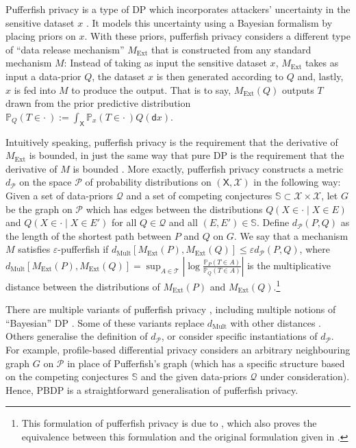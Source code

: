 \documentclass{article}
\theoremstyle{plain}
\theoremstyle{plain}
\theoremstyle{definition}
\theoremstyle{remark}
\theoremstyle{plain}
\newcommand{\xset}{\mathsf{X}}
\newcommand{\Mext}{M_{\mathrm{Ext}}}
\newcommand{\dMult}{d_{\mathrm{Mult}}}
\renewcommand{\epsilon}{\varepsilon}
\begin{document}
Pufferfish privacy is a type of DP which incorporates attackers' uncertainty in the sensitive dataset $x$ \citep{kiferPufferfishFrameworkMathematical2014}. It models this uncertainty using a Bayesian formalism by placing priors on $x$. With these priors, pufferfish privacy considers a different type of ``data release mechanism'' $\Mext$ that is constructed from any standard mechanism $M$: Instead of taking as input the sensitive dataset $x$, $\Mext$ takes as input a data-prior $Q$, the dataset $x$ is then generated according to $Q$ and, lastly, $x$ is fed into $M$ to produce the output. That is to say, $\Mext(Q)$ outputs $T$ drawn from the prior predictive distribution $\mathbb P_Q(T \in \cdot \ ) := \int_{\mathsf X} \mathbb P_{x}(T \in \cdot \ ) Q(\mathsf d x)$.

Intuitively speaking, pufferfish privacy is the requirement that the derivative of $M_{\mathrm{Ext}}$ is bounded, in just the same way that pure DP is the requirement that the derivative of $M$ is bounded \citep{bailiePrivacyDifferentialsDifferential2026, bailieGeneralInferentialLimits2024}. More exactly, pufferfish privacy constructs a metric $d_{\mathcal P}$ on the space $\mathcal P$ of probability distributions on $(\xset, \mathcal X)$ in the following way: Given a set of data-priors $\mathcal Q$ and a set of competing conjectures $\mathbb S \subset \mathcal X \times \mathcal X$, let $G$ be the graph on $\mathcal P$ which has edges between the distributions $Q(X \in \cdot \mid X \in E)$ and $Q(X \in \cdot \mid X \in E')$ for all $Q \in \mathcal Q$ and all $(E, E') \in \mathbb S$. Define $d_{\mathcal P}(P, Q)$ as the length of the shortest path between $P$ and $Q$ on $G$. We say that a mechanism $M$ satisfies $\epsilon$-pufferfish if $\dMult[ \Mext(P), \Mext(Q)] \le \epsilon d_{\mathcal P}(P,Q)$, where $\dMult[ \Mext(P), \Mext(Q)] = \sup_{A \in \mathcal T} \left| \log \frac{\mathbb P_P(T \in A)}{\mathbb P_Q(T \in A)} \right|$ is the multiplicative distance between the distributions of $\Mext(P)$ and $\Mext(Q)$.\footnote{This formulation of pufferfish privacy is due to \citet{bailieGeneralInferentialLimits2024}, 
which also proves the equivalence between this formulation and the original formulation given in
\citet{kiferPufferfishFrameworkMathematical2014}.} 

There are multiple variants of pufferfish privacy \citep[see][and references therein]{bailiePrivacyDifferentialsDifferential2026}, including multiple notions of ``Bayesian'' DP \citep{yangBayesianDifferentialPrivacy2015, triastcynBayesianDifferentialPrivacy2020, aliakbarpourEnhancingFeatureSpecificData2025}. Some of these variants replace $\dMult$ with other distances \citep[or, more generally, premetrics---see][]{bailiePrivacyDifferentialsDifferential2026}. Others generalise the definition of $d_{\mathcal P}$, or consider specific instantiations of $d_{\mathcal P}$. For example, profile-based differential privacy \citep[PBDP,][]{geumlekProfilebasedPrivacyLocally2019} considers an arbitrary neighbouring graph $G$ on $\mathcal P$ in place of Pufferfish's graph (which has a specific structure based on the competing conjectures $\mathbb S$ and the given data-priors $\mathcal Q$ under consideration). Hence, PBDP is a straightforward generalisation of pufferfish privacy.
\end{document}
